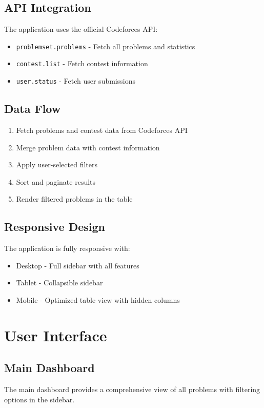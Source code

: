 \documentclass[12pt,a4paper]{article}
\begin{document}
\subsection{API Integration}
The application uses the official Codeforces API:
\begin{itemize}[leftmargin=*]
    \item \texttt{problemset.problems} - Fetch all problems and statistics
    \item \texttt{contest.list} - Fetch contest information
    \item \texttt{user.status} - Fetch user submissions
\end{itemize}

\subsection{Data Flow}
\begin{enumerate}[leftmargin=*]
    \item Fetch problems and contest data from Codeforces API
    \item Merge problem data with contest information
    \item Apply user-selected filters
    \item Sort and paginate results
    \item Render filtered problems in the table
\end{enumerate}

\subsection{Responsive Design}
The application is fully responsive with:
\begin{itemize}[leftmargin=*]
    \item Desktop - Full sidebar with all features
    \item Tablet - Collapsible sidebar
    \item Mobile - Optimized table view with hidden columns
\end{itemize}

\newpage

\section{User Interface}

\subsection{Main Dashboard}
The main dashboard provides a comprehensive view of all problems with filtering options in the sidebar.
\end{document}
